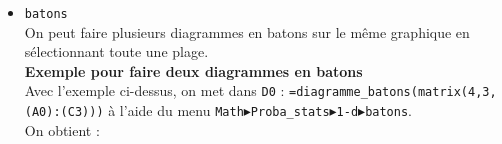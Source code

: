\documentclass[a4paper,11pt]{book}
\begin{document}
\begin{itemize}
\item {\tt batons}\\
On peut faire plusieurs diagrammes en batons sur le m\^eme graphique en 
s\'electionnant toute une plage.\\
 {\bf Exemple pour faire deux diagrammes en batons}\\
Avec l'exemple ci-dessus, on met dans {\tt D0} : 
{\tt =diagramme\_batons(matrix(4,3,(A0):(C3)))} \`a l'aide 
du menu {\tt Math$\blacktriangleright$Proba\_stats$\blacktriangleright$1-d$\blacktriangleright$batons}.\\
On obtient :
\begin{center}\end{center}


\end{itemize}
\end{document}
